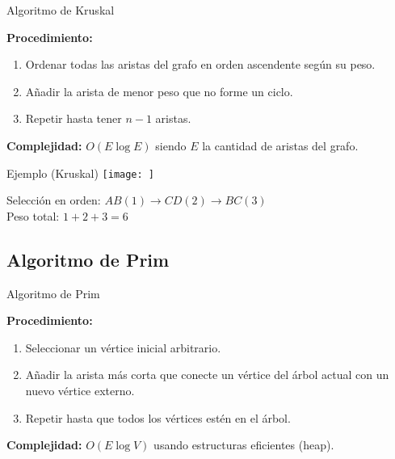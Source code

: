 \documentclass{beamer}
\begin{document}
\begin{frame}{Algoritmo de Kruskal}

\textbf{Procedimiento:}
\begin{enumerate}
    \item Ordenar todas las aristas del grafo en orden ascendente según su peso.
    \item Añadir la arista de menor peso que no forme un ciclo.
    \item Repetir hasta tener $n-1$ aristas.
\end{enumerate}

\textbf{Complejidad:}  
$O(E \log E)$ siendo $E$ la cantidad de aristas del grafo.

\end{frame}

\begin{frame}{Ejemplo (Kruskal)}
\centering
\texttt{[image: ]}
\vspace{0.3cm}

{\small Selección en orden: $AB(1)\rightarrow CD(2)\rightarrow BC(3)$\\
Peso total: $1+2+3=6$}

\end{frame}

\subsection{Algoritmo de Prim}

\begin{frame}{Algoritmo de Prim}

\textbf{Procedimiento:}
\begin{enumerate}
    \item Seleccionar un vértice inicial arbitrario.
    \item Añadir la arista más corta que conecte un vértice del árbol actual con un nuevo vértice externo.
    \item Repetir hasta que todos los vértices estén en el árbol.
\end{enumerate}

\textbf{Complejidad:} $O(E \log V)$ usando estructuras eficientes (heap).

\end{frame}
\end{document}
